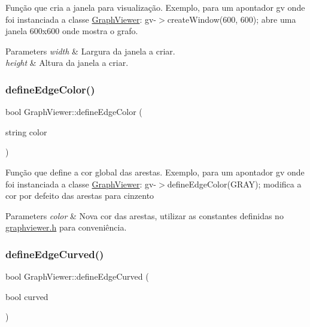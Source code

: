 Função que cria a janela para visualização. Exemplo, para um apontador gv onde foi instanciada a classe \hyperlink{class_graph_viewer}{Graph\+Viewer}\+: gv-\/$>$create\+Window(600, 600); abre uma janela 600x600 onde mostra o grafo.


\begin{DoxyParams}{Parameters}
{\em width} & Largura da janela a criar. \\
\hline
{\em height} & Altura da janela a criar. \\
\hline
\end{DoxyParams}
\hypertarget{class_graph_viewer_a4102580b69826ba83251ef7bb262f8be}{}\label{class_graph_viewer_a4102580b69826ba83251ef7bb262f8be} 
\subsubsection{\texorpdfstring{define\+Edge\+Color()}{defineEdgeColor()}}
{\footnotesize\ttfamily bool Graph\+Viewer\+::define\+Edge\+Color (\begin{DoxyParamCaption}\item[{string}]{color }\end{DoxyParamCaption})}

Função que define a cor global das arestas. Exemplo, para um apontador gv onde foi instanciada a classe \hyperlink{class_graph_viewer}{Graph\+Viewer}\+: gv-\/$>$define\+Edge\+Color(\+G\+R\+A\+Y); modifica a cor por defeito das arestas para cinzento


\begin{DoxyParams}{Parameters}
{\em color} & Nova cor das arestas, utilizar as constantes definidas no \hyperlink{graphviewer_8h}{graphviewer.\+h} para conveniência. \\
\hline
\end{DoxyParams}
\hypertarget{class_graph_viewer_a08f362be0e682d91e7506dca8caae1b8}{}\label{class_graph_viewer_a08f362be0e682d91e7506dca8caae1b8} 
\subsubsection{\texorpdfstring{define\+Edge\+Curved()}{defineEdgeCurved()}}
{\footnotesize\ttfamily bool Graph\+Viewer\+::define\+Edge\+Curved (\begin{DoxyParamCaption}\item[{bool}]{curved }\end{DoxyParamCaption})}

